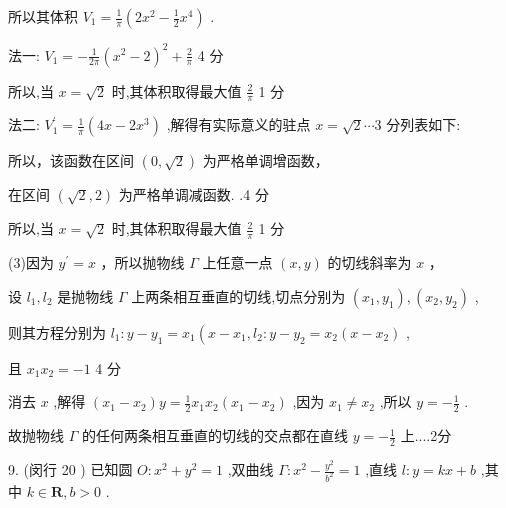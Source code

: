 \documentclass[10pt]{article}
\begin{document}
所以其体积 \({V}_{1} = \frac{1}{\pi }\left( {2{x}^{2} - \frac{1}{2}{x}^{4}}\right)\) .

法一: \({V}_{1} =  - \frac{1}{2\pi }{\left( {x}^{2} - 2\right) }^{2} + \frac{2}{\pi }\) 4 分

所以,当 \(x = \sqrt{2}\) 时,其体积取得最大值 \(\frac{2}{\pi }\) 1 分

法二: \({V}_{1}^{\prime } = \frac{1}{\pi }\left( {{4x} - 2{x}^{3}}\right)\) ,解得有实际意义的驻点 \(x = \sqrt{2}\cdots 3\) 分列表如下:

\begin{center}
\end{center}

所以，该函数在区间 \(\left( {0,\sqrt{2}}\right)\) 为严格单调增函数，

在区间 \(\left( {\sqrt{2},2}\right)\) 为严格单调减函数. .4 分

所以,当 \(x = \sqrt{2}\) 时,其体积取得最大值 \(\frac{2}{\pi }\) 1 分

(3)因为 \({y}^{\prime } = x\) ，所以抛物线 \(\Gamma\) 上任意一点 \(\left( {x,y}\right)\) 的切线斜率为 \(x\) ，

设 \({l}_{1},{l}_{2}\) 是抛物线 \(\Gamma\) 上两条相互垂直的切线,切点分别为 \(\left( {{x}_{1},{y}_{1}}\right) ,\left( {{x}_{2},{y}_{2}}\right)\) ,

则其方程分别为 \({l}_{1} : y - {y}_{1} = {x}_{1}\left( {x - {x}_{1},{l}_{2} : y - {y}_{2} = {x}_{2}\left( {x - {x}_{2}}\right) }\right.\) ,

且 \({x}_{1}{x}_{2} =  - 1\) 4 分

消去 \(x\) ,解得 \(\left( {{x}_{1} - {x}_{2}}\right) y = \frac{1}{2}{x}_{1}{x}_{2}\left( {{x}_{1} - {x}_{2}}\right)\) ,因为 \({x}_{1} \neq  {x}_{2}\) ,所以 \(y =  - \frac{1}{2}\) .

故抛物线 \(\Gamma\) 的任何两条相互垂直的切线的交点都在直线 \(y =  - \frac{1}{2}\) 上....2分

9. (闵行 20 ) 已知圆 \(O : {x}^{2} + {y}^{2} = 1\) ,双曲线 \(\Gamma  : {x}^{2} - \frac{{y}^{2}}{{b}^{2}} = 1\) ,直线 \(l : y = {kx} + b\) ,其中 \(k \in  \mathbf{R},b > 0\) .
\end{document}
